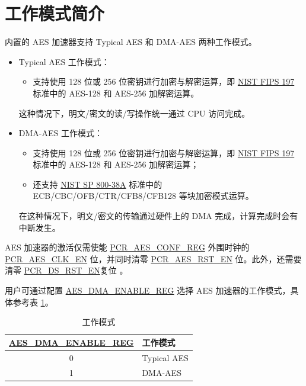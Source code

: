 \documentclass[main\_\_CN.tex]{subfiles}
\begin{document}
\section{工作模式简介}

\chipname{} 内置的 AES 加速器支持 Typical AES 和 DMA-AES 两种工作模式。

\begin{itemize}
    \item Typical AES 工作模式：
    \begin{itemize}
        \item 支持使用 128 位或 256 位密钥进行加密与解密运算，即 \href{https://nvlpubs.nist.gov/nistpubs/FIPS/NIST.FIPS.197.pdf}{NIST FIPS 197} 标准中的 AES-128 和 AES-256  加解密运算。
    \end{itemize}
    这种情况下，明文/密文的读/写操作统一通过 CPU 访问完成。
    \item DMA-AES 工作模式：
    \begin{itemize}
        \item 支持使用 128 位或 256 位密钥进行加密与解密运算，即 \href{https://nvlpubs.nist.gov/nistpubs/FIPS/NIST.FIPS.197.pdf}{NIST FIPS 197} 标准中的 AES-128 和 AES-256 加解密运算；
        \item 还支持 \href{https://nvlpubs.nist.gov/nistpubs/Legacy/SP/nistspecialpublication800-38a.pdf}{NIST SP 800-38A} 标准中的 ECB/CBC/OFB/CTR/CFB8/CFB128 等块加密模式运算。
    \end{itemize}
    在这种情况下，明文/密文的传输通过硬件上的 DMA 完成，计算完成时会有中断发生。
\end{itemize}

AES 加速器的激活仅需使能 \hyperref[regdesc:PCRAESCONFREG]{PCR\_AES\_CONF\_REG} 外围时钟的 \hyperref[fielddesc:PCRRSACLKEN]{PCR\_AES\_CLK\_EN} 位，并同时清零 \hyperref[fielddesc:PCRRSARSTEN]{PCR\_AES\_RST\_EN} 位。此外，还需要清零 \hyperref[fielddesc:PCRDSRSTEN]{PCR\_DS\_RST\_EN}复位 。

用户可通过配置 \hyperref[regdesc:AESDMAENABLEREG]{AES\_DMA\_ENABLE\_REG} 选择 AES 加速器的工作模式，具体参考表 \ref{tab:aes-dma-enable}。

\begin{longtable}[c]{ |c|l| }
\caption{工作模式}
\label{tab:aes-dma-enable}
\\\hline 
\rowcolor{lightgray}
\textbf{\hyperref[regdesc:AESDMAENABLEREG]{AES\_DMA\_ENABLE\_REG}}       & \textbf{工作模式}\\
    \hline
    0           & Typical AES    \\
    \hline
    1           & DMA-AES        \\
    \hline
\end{longtable}
\end{document}
